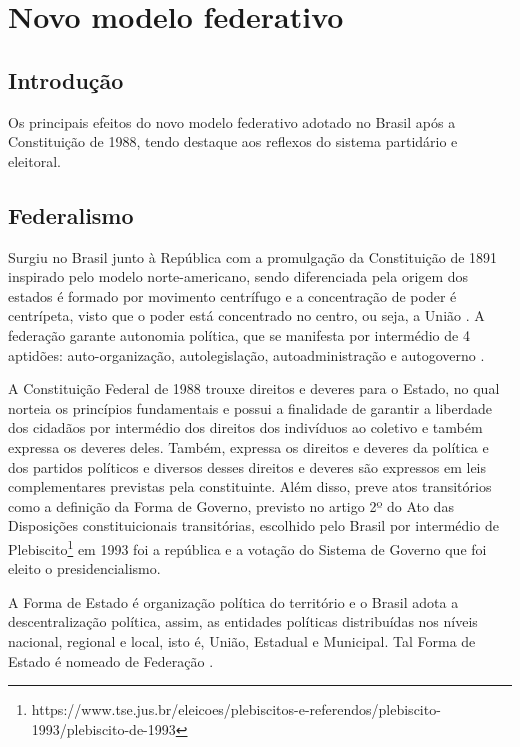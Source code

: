 \section{Novo modelo federativo} \label{politica}


\subsection{Introdução}
Os principais efeitos do novo modelo federativo adotado no Brasil após a Constituição de 1988, tendo  destaque aos reflexos do sistema partidário e eleitoral.


\subsection{Federalismo}

Surgiu no Brasil junto à República com a promulgação da Constituição de 1891 inspirado pelo modelo norte-americano, sendo diferenciada pela origem dos estados é formado por movimento centrífugo e a concentração de poder é centrípeta, visto que o poder está concentrado no centro, ou seja, a União \cite{matias2014curso,mendes2011branco}.
A federação garante autonomia política, que se manifesta por intermédio de 4 aptidões: auto-organização, autolegislação, autoadministração e autogoverno \cite{matias2014curso}.


A Constituição Federal de 1988 trouxe direitos e deveres para o Estado, no qual norteia os princípios fundamentais e possui a finalidade de garantir a liberdade dos cidadãos por intermédio dos direitos dos indivíduos ao coletivo e também expressa os deveres deles.
Também, expressa os direitos e deveres da política e dos partidos políticos e diversos desses direitos e deveres são expressos em leis complementares previstas pela constituinte.
Além disso, preve atos transitórios como a definição da Forma de Governo, previsto no artigo 2º do Ato das Disposições constituicionais transitórias, escolhido pelo Brasil por intermédio de Plebiscito\footnote{https://www.tse.jus.br/eleicoes/plebiscitos-e-referendos/plebiscito-1993/plebiscito-de-1993} em 1993 foi a república e a votação do Sistema de Governo que foi eleito o presidencialismo.

A Forma de Estado é organização política do território e o Brasil adota a descentralização política, assim, as entidades políticas distribuídas nos níveis nacional, regional e local, isto é, União, Estadual e Municipal.  
Tal Forma de Estado é nomeado de Federação \cite{pedro_lenza2021direito}. 

